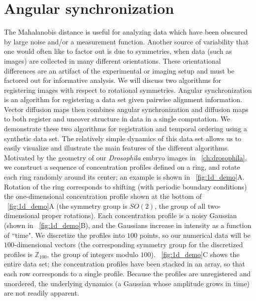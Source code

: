 \section{Angular synchronization } \label{sec:ang_synch}

The Mahalanobis distance is useful for analyzing data which have been obscured by large noise and/or a measurement function. 
%
Another source of variability that one would often like to factor out is due to symmetries, when data (such as images) are collected in many different orientations. 
%
These orientational differences are an artifact of the experimental or imaging setup and must be factored out for informative analysis.
%
We will discuss two algorithms for registering images with respect to rotational symmetries. 
%
Angular synchronization \cite{singer2011angular} is an algorithm for registering a data set given pairwise alignment information. 
%
Vector diffusion maps \cite{singer2012vector} then combines angular synchronization and diffusion maps to both register and uncover structure in data in a single computation. 
%
We demonstrate these two algorithms for registration and temporal ordering using a synthetic data set.
%
The relatively simple dynamics of this data set allows us to easily visualize and illustrate the main features of the different algorithms.
%
Motivated by the geometry of our {\em Drosophila} embryo images in \chap~\ref{ch:drosophila}, we construct a sequence of concentration profiles defined on a ring, and rotate each ring randomly around its center; an example is shown in \fig~\ref{fig:1d_demo}A.
%
Rotation of the ring corresponds to shifting (with periodic boundary conditions) the one-dimensional concentration profile shown at the bottom of \fig~\ref{fig:1d_demo}A (the symmetry group is $SO(2)$, the group of all two-dimensional proper rotations).
%
Each concentration profile is a noisy Gaussian (shown in \fig~\ref{fig:1d_demo}B), and the Gaussians increase in intensity as a function of ``time".
%
We discretize the profiles into $100$ points, so our numerical data will be $100$-dimensional vectors (the corresponding symmetry group for the discretized profiles is $\mathbb{Z}_{100}$, the group of integers modulo $100$).
%
\fig~\ref{fig:1d_demo}C shows the entire data set; the concentration profiles have been stacked in an array, so that each row corresponds to a single profile.
%
Because the profiles are unregistered and unordered, the underlying dynamics (a Gaussian whose amplitude grows in time) are not readily apparent.

